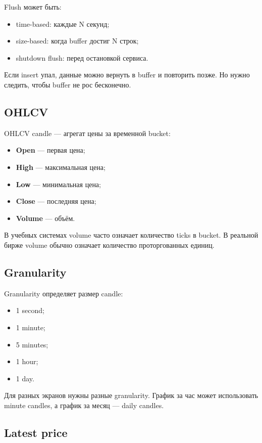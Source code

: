 \documentclass[12pt,a4paper]{article}
\begin{document}
Flush может быть:
\begin{itemize}
    \item time-based: каждые N секунд;
    \item size-based: когда buffer достиг N строк;
    \item shutdown flush: перед остановкой сервиса.
\end{itemize}

Если insert упал, данные можно вернуть в buffer и повторить позже. Но нужно
следить, чтобы buffer не рос бесконечно.

\subsection{OHLCV}

OHLCV candle --- агрегат цены за временной bucket:
\begin{itemize}
    \item \textbf{Open} --- первая цена;
    \item \textbf{High} --- максимальная цена;
    \item \textbf{Low} --- минимальная цена;
    \item \textbf{Close} --- последняя цена;
    \item \textbf{Volume} --- объём.
\end{itemize}

В учебных системах volume часто означает количество ticks в bucket. В реальной
бирже volume обычно означает количество проторгованных единиц.

\subsection{Granularity}

Granularity определяет размер candle:
\begin{itemize}
    \item 1 second;
    \item 1 minute;
    \item 5 minutes;
    \item 1 hour;
    \item 1 day.
\end{itemize}

Для разных экранов нужны разные granularity. График за час может использовать
minute candles, а график за месяц --- daily candles.

\subsection{Latest price}
\end{document}

